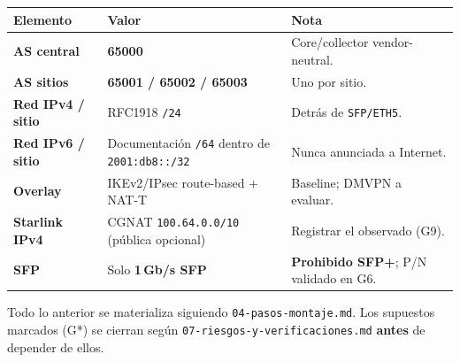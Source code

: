 \documentclass[11pt,a4paper]{article}
\newcommand{\hcell}[1]{\textbf{#1}}
\newcommand{\file}[1]{\texttt{#1}}
\begin{document}
\begin{tabularx}{\linewidth}{@{}>{\bfseries}p{3.4cm}p{4.8cm}X@{}}
\toprule
\hcell{Elemento} & \hcell{Valor} & \hcell{Nota} \\
\midrule
AS central      & \textbf{65000}                        & Core/collector vendor-neutral. \\
AS sitios       & \textbf{65001 / 65002 / 65003}        & Uno por sitio. \\
Red IPv4 / sitio & RFC1918 \texttt{/24}                 & Detrás de \texttt{SFP/ETH5}. \\
Red IPv6 / sitio & Documentación \texttt{/64} dentro de \texttt{2001:db8::/32} &
                   Nunca anunciada a Internet. \\
Overlay         & IKEv2/IPsec route-based + NAT-T       & Baseline; DMVPN a evaluar. \\
Starlink IPv4   & CGNAT \texttt{100.64.0.0/10} (pública opcional) & Registrar el observado (G9). \\
SFP             & Solo \textbf{1\,Gb/s SFP}             & \textbf{Prohibido SFP+}; P/N validado en G6. \\
\bottomrule
\end{tabularx}

\vspace{1em}
\begin{nota}
\small
Todo lo anterior se materializa siguiendo \file{04-pasos-montaje.md}.
Los supuestos marcados (G*) se cierran según \file{07-riesgos-y-verificaciones.md}
\textbf{antes} de depender de ellos.
\end{nota}
\end{document}
